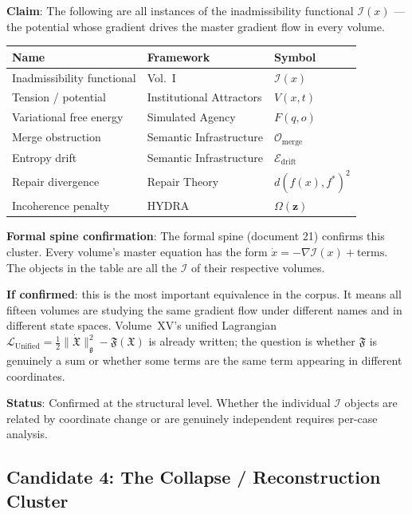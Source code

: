 \documentclass[11pt, a4paper]{article}
\begin{document}
\begin{candbox}
\textbf{Claim}: The following are all instances of the inadmissibility
functional $\mathcal{I}(x)$ --- the potential whose gradient drives
the master gradient flow in every volume.

\medskip
\begin{tabular}{lll}
\textbf{Name} & \textbf{Framework} & \textbf{Symbol} \\
\hline
Inadmissibility functional & Vol.~I & $\mathcal{I}(x)$ \\
Tension / potential & Institutional Attractors & $V(x,t)$ \\
Variational free energy & Simulated Agency & $F(q,o)$ \\
Merge obstruction & Semantic Infrastructure & $\mathcal{O}_\mathrm{merge}$ \\
Entropy drift & Semantic Infrastructure & $\mathcal{E}_\mathrm{drift}$ \\
Repair divergence & Repair Theory & $d(f(x), f^*)^2$ \\
Incoherence penalty & HYDRA & $\Omega(\mathbf{z})$ \\
\end{tabular}

\medskip
\textbf{Formal spine confirmation}: The formal spine (document 21)
confirms this cluster. Every volume's master equation has the form
$\dot{x} = -\nabla \mathcal{I}(x) + \text{terms}$. The objects in
the table are all the $\mathcal{I}$ of their respective volumes.

\medskip
\textbf{If confirmed}: this is the most important equivalence in the
corpus. It means all fifteen volumes are studying the same gradient flow
under different names and in different state spaces. Volume~XV's unified
Lagrangian $\mathcal{L}_\mathrm{Unified} = \frac{1}{2}\|\dot{\mathfrak{X}}
\|^2_\mathfrak{g} - \mathfrak{F}(\mathfrak{X})$ is already written; the
question is whether $\mathfrak{F}$ is genuinely a sum or whether some
terms are the same term appearing in different coordinates.

\medskip
\textbf{Status}: Confirmed at the structural level. Whether the
individual $\mathcal{I}$ objects are related by coordinate change or are
genuinely independent requires per-case analysis.
\end{candbox}

\subsection{Candidate 4: The Collapse / Reconstruction Cluster}
\end{document}

